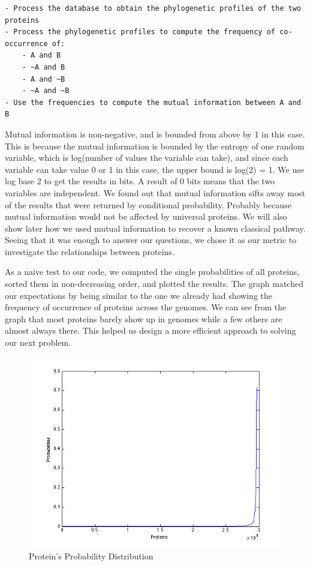 \documentclass{ucetd}
\begin{document}
\begin{verbatim}
- Process the database to obtain the phylogenetic profiles of the two proteins 
- Process the phylogenetic profiles to compute the frequency of co-occurrence of:
    - A and B
    - ~A and B
    - A and ~B
    - ~A and ~B
- Use the frequencies to compute the mutual information between A and B
\end{verbatim}

Mutual information is non-negative, and is bounded from above by 1 in this case. This is because the mutual information is bounded by the entropy of one random variable, which is log(number of values the variable can take), and since each variable can take value 0 or 1 in this case, the upper bound is log(2)  = 1. We use log base 2 to get the results in bits. A result of 0 bits means that the two variables are independent. We found out that mutual information sifts away most of the results that were returned by conditional probability. Probably because mutual information would not be affected by universal proteins. We will also show later how we used mutual information to recover a known classical pathway. Seeing that it was enough to answer our questions, we chose it as our metric to investigate the relationships between proteins.

\newpage
As a naive test to our code, we computed the single probabilities of all proteins, sorted them in non-decreasing order, and plotted the results. The graph matched our expectations by being similar to the one we already had showing the frequency of occurrence of proteins across the genomes. 
We can see from the graph that most proteins barely show up in genomes while a few others are almost always there. This helped us design a more efficient approach to solving our next problem. 
\begin{figure}[b!]
\centering
\includegraphics[scale=0.8]{sorted}
\caption{Protein's Probability Distribution}
\label{fig:Protein's Probability Distribution}
\end{figure}
\newpage
\end{document}
